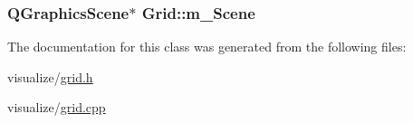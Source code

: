 \label{class_grid_a3af909c8dfab0cb7454edeedec81341b}
\hypertarget{class_grid_a8e2452e800bfbad1b718ebb35f8abb70}{
\subsubsection[{m\_\-Scene}]{\setlength{\rightskip}{0pt plus 5cm}QGraphicsScene$\ast$ {\bf Grid::m\_\-Scene}}}
\label{class_grid_a8e2452e800bfbad1b718ebb35f8abb70}


The documentation for this class was generated from the following files:\begin{DoxyCompactItemize}
\item 
visualize/\hyperlink{grid_8h}{grid.h}\item 
visualize/\hyperlink{grid_8cpp}{grid.cpp}\end{DoxyCompactItemize}
